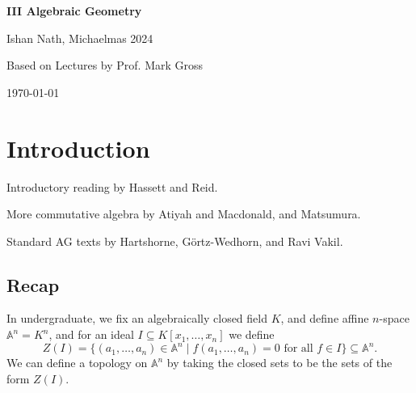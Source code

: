 \documentclass[12pt]{article}
\begin{document}
\hypersetup{pageanchor=false}
\begin{titlepage}
	\begin{center}
		\vspace*{1em}
		\Huge
		\textbf{III Algebraic Geometry}

		\vspace{1em}
		\large
		Ishan Nath, Michaelmas 2024

		\vspace{1.5em}

		\Large

		Based on Lectures by Prof. Mark Gross

		\vspace{1em}

		\large
		\today
	\end{center}
	
\end{titlepage}
\hypersetup{pageanchor=true}

\tableofcontents

\newpage


\setcounter{section}{-1}

\section{Introduction}%
\label{sec:intro}

Introductory reading by Hassett and Reid.

More commutative algebra by Atiyah and Macdonald, and Matsumura.

Standard AG texts by Hartshorne, G\"ortz-Wedhorn, and Ravi Vakil.

\subsection{Recap}%
\label{sub:recap}

In undergraduate, we fix an algebraically closed field $K$, and define affine $n$-space $\mathbb{A}^n = K^n$, and for an ideal $I \subseteq K[x_1, \ldots, x_n]$ we define
\[
	Z(I) = \{(a_1, \ldots, a_n) \in \mathbb{A}^n \mid f(a_1, \ldots, a_n) = 0 \text{ for all } f \in I \} \subseteq \mathbb{A}^n.
\]
We can define a topology on $\mathbb{A}^n$ by taking the closed sets to be the sets of the form $Z(I)$.
\end{document}
